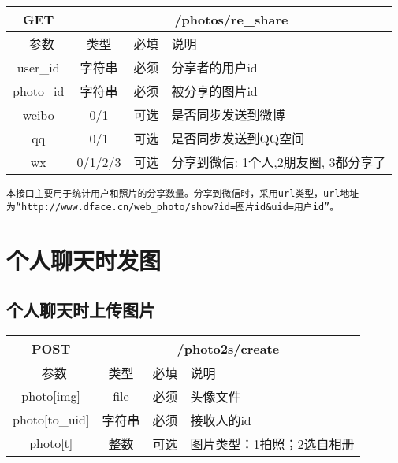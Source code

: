 \begin{table}[H]
   \begin{center}
\begin{tabular}{|c|c|c|p{12cm}|}
\hline
GET & \multicolumn{3}{|c|}{/photos/re\_share} \\
\hline\hline
 \  参数  & 类型 & 必填 &  说明  \\
 \hline
 user\_id  & 字符串 & 必须 & 分享者的用户id\\ 
  \hline
 photo\_id  & 字符串 & 必须 & 被分享的图片id\\ 
 \hline
 weibo  & 0/1 & 可选  &  是否同步发送到微博\\
  \hline
 qq  & 0/1 & 可选  &  是否同步发送到QQ空间\\
  \hline
 wx  & 0/1/2/3 & 可选  &  分享到微信: 1个人,2朋友圈, 3都分享了\\
\hline
\end{tabular}
   \end{center}
\end{table}

\begin{verbatim}
本接口主要用于统计用户和照片的分享数量。分享到微信时，采用url类型，url地址为“http://www.dface.cn/web_photo/show?id=图片id&uid=用户id”。
\end{verbatim}



\section{个人聊天时发图}

\subsection{个人聊天时上传图片}

\begin{table}[H]
   \begin{center}
\begin{tabular}{|c|c|c|p{12cm}|}
\hline
POST & \multicolumn{3}{|c|}{/photo2s/create} \\
\hline\hline
 \  参数  & 类型 & 必填 &  说明  \\
\hline
 photo[img]  & file & 必须 &  头像文件\\
 \hline
 photo[to\_uid]  & 字符串 & 必须 &  接收人的id\\
\hline
  photo[t]  & 整数 & 可选 &  图片类型：1拍照；2选自相册\\
 \hline
\end{tabular}
   \end{center}
\end{table}


